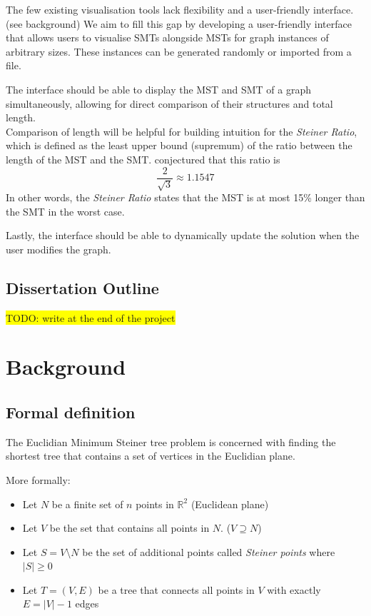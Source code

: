 \documentclass{l4proj}
\begin{document}
The few existing visualisation tools lack flexibility and a user-friendly interface. (see background)
We aim to fill this gap by developing a user-friendly interface that allows users to visualise SMTs alongside MSTs for graph instances of arbitrary sizes. These instances can be generated randomly or imported from a file.

The interface should be able to display the MST and SMT of a graph simultaneously, allowing for direct comparison of their structures and total length.
\\
Comparison of length will be helpful for building intuition for the \textit{Steiner Ratio},  which is defined as the least upper bound (supremum) of the ratio between the length of the MST and the SMT.  \cite{Gilbert1968SteinerMT} conjectured that this ratio is $$\frac{2}{\sqrt{3}} \approx 1.1547$$
In other words, the \textit{Steiner Ratio} states that the MST is at most 15\% longer than the SMT in the worst case.

Lastly, the interface should be able to dynamically update the solution when the user modifies the graph.

\section{Dissertation Outline}

\colorbox{yellow}{TODO: write at the end of the project}





\chapter{Background}

\section{Formal definition}
The Euclidian Minimum Steiner tree problem is concerned with finding the shortest tree that contains a set of vertices in the Euclidian plane.

More formally:
\begin{itemize}
      \item Let $N$ be a finite set of $n$ points in $\mathbb{R}^2$ (Euclidean plane)
      \item Let $V$ be the set that contains all points in $N$. ($V \supseteq N$)
      \item Let $S = V \setminus N$ be the set of additional points called \textit{Steiner points} where $|S| \geq 0$
      \item Let $T = (V, E)$ be a tree that connects all points in $V$ with exactly $E = |V| - 1$ edges
\end{itemize}
\end{document}
